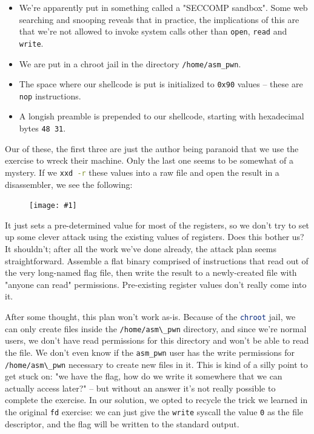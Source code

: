 \documentclass{article}
\newcommand{\displayimage}[1] {
\begin{figure}[H]
    \centering
    \texttt{[image: \#1]} 
\end{figure}
}
\newcommand{\xcode}[2]{\colorbox{ubuntuback}{\lstinline[language=#1]|#2|}}
\newcommand{\asm}[1]{\xcode{{[x86masm]assembler}}{#1}}
\newcommand{\code}[1]{\colorbox{ubuntuback}{\texttt{#1}}}
\begin{document}
\begin{itemize}
    \item We're apparently put in something called a "SECCOMP sandbox". Some web searching and snooping reveals that in practice, the implications of this are that we're not allowed to invoke system calls other than \code{open}, \code{read} and \code{write}.
    \item We are put in a chroot jail in the directory \xcode{bash}{/home/asm_pwn}.
    \item The space where our shellcode is put is initialized to \code{0x90} values -- these are \asm{nop} instructions. 
    \item A longish preamble is prepended to our shellcode, starting with hexadecimal bytes \code{48 31}.
\end{itemize}

Our of these, the first three are just the author being paranoid that we use the exercise to wreck their machine. Only the last one seems to be somewhat of a mystery. If we \xcode{bash}{xxd -r} these values into a raw file and open the result in a disassembler, we see the following:

\displayimage{../17_asm/stub.png}

It just sets a pre-determined value for most of the registers, so we don't try to set up some clever attack using the existing values of registers. Does this bother us? It shouldn't; after all the work we've done already, the attack plan seems straightforward. Assemble a flat binary comprised of instructions that read out of the very long-named flag file, then write the result to a newly-created file with "anyone can read" permissions. Pre-existing register values don't really come into it.

After some thought, this plan won't work as-is. Because of the \xcode{bash}{chroot} jail, we can only create files inside the \xcode{bash}{/home/asm\_pwn} directory, and since we're normal users, we don't have read permissions for this directory and won't be able to read the file. We don't even know if the \code{asm\_pwn} user has the write permissions for \xcode{bash}{/home/asm\_pwn} necessary to create new files in it. This is kind of a silly point to get stuck on: "we have the flag, how do we write it somewhere that we can actually access later?" -- but without an answer it's not really possible to complete the exercise. In our solution, we opted to recycle the trick we learned in the original \code{fd} exercise: we can just give the \code{write} syscall the value \code{0} as the file descriptor, and the flag will be written to the standard output.
\end{document}
